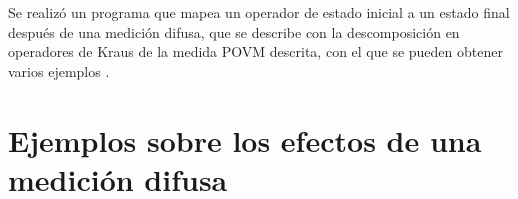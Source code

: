 Se realizó un programa que mapea un operador de estado inicial a un estado
final después de una medición difusa, que se describe con la descomposición en
operadores de Kraus de la medida POVM descrita, con el que se pueden obtener
varios ejemplos {\cite{enlacepropio}}.

\begin{comment} \subsection{Otra aproximación} %
    Ahora, considerando una medida proyectiva, supóngase que el observable es no degenerado y la salida de la medición sobre el estado inicial $\rho $ fue el valor propio $a_j b_k$ con $j,k=0,1$ y el operador de proyección será $P_{a_j,b_k}$. Luego, el estado después de la medición será \begin{equation}
       \begin{split}
           \rho'&= p\dfrac{ P_{a_j,b_k}\rho P_{a_j,b_k}}{\tr(\rho P_{a_j,b_k})}+ (1-p)\dfrac{S P_{a_j,b_k}\rho P_{a_j,b_k}S^\dagger}{\tr(\rho P_{a_j,b_k} S^\dagger SP_{a_j,b_k})}\\
           &=\dfrac{p P_{a_j,b_k}\rho P_{a_j,b_k}+(1-p) S P_{a_j,b_k}\rho P_{a_j,b_k}S^\dagger}{\tr(\rho P_{a_j,b_k})},
       \end{split}
    \end{equation} donde $S$ es el operador SWAP\@. En consecuencia, los operadores de Kraus que describen el efecto de la medición para una medida selectiva serán $\{\sqrt{p}P_{a_j,b_k}, (\sqrt{1-p})S P_{a_j,b_k}\}$, con $j,k=0,1$. Este mapeo contempla la forma de la operaciones cuánticas normalizadas $\E(\rho)/\tr(\E(\rho))$. Para esta aproximación se realizó un  programa que mapea un operador de estado inicial a un estado final después de una medición difusa, que se describe con esta aproximación con la que se pueden obtener varios ejemplos. El programa se puede obtener en el repositorio \href{https://github.com/Mohs9/Practicas_Tesis/blob/d751cf4a3b187f124057c927433b29aa6d918ef1/InformeFinal/Code/FuzzyMeasure.nb}{\textit{al presionar este texto.}}
\end{comment}
    


\section{Ejemplos sobre los efectos de una medición difusa} %

